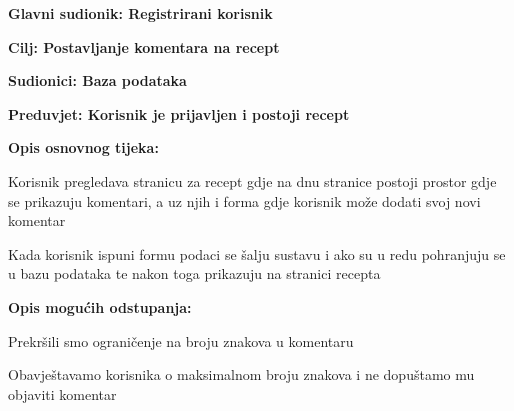 				
				\noindent {}
				\begin{packed_item}
					
					\item \textbf{Glavni sudionik: Registrirani korisnik}
					\item  \textbf{Cilj: Postavljanje komentara na recept} 
					\item  \textbf{Sudionici: Baza podataka} 
					\item  \textbf{Preduvjet: Korisnik je prijavljen i postoji recept} 
					\item  \textbf{Opis osnovnog tijeka:}
					
					\item[] \begin{packed_enum}
						
						\item Korisnik pregledava stranicu za recept gdje na dnu stranice postoji prostor gdje se prikazuju komentari, a uz njih i forma gdje korisnik može dodati svoj novi komentar
						\item Kada korisnik ispuni formu podaci se šalju sustavu i ako su u redu pohranjuju se u bazu podataka te nakon toga prikazuju na stranici recepta
					\end{packed_enum}
					
					\item  \textbf{Opis mogućih odstupanja:}
					
					\item[] \begin{packed_item}
						
						\item[2.a] Prekršili smo ograničenje na broju znakova u komentaru
						\item[] \begin{packed_enum}
							
							\item Obavještavamo korisnika o maksimalnom broju znakova i ne dopuštamo mu objaviti komentar 
						\end{packed_enum}
						
						
					\end{packed_item}
				\end{packed_item}
				
